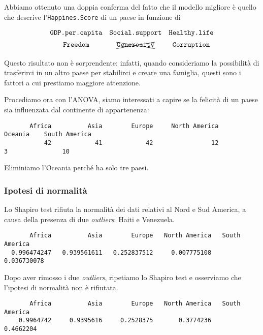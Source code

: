 \documentclass{beamer}
\newcommand{\fg}[2]{%
  \begin{center}
      \texttt{[image: \#2]}%
  \end{center}
}
\begin{document}
\begin{frame}
    Abbiamo ottenuto una doppia conferma del fatto che il modello migliore è quello che descrive l'\texttt{Happines.Score} di un paese in funzione di 
    \begin{equation*}
    {\renewcommand*{\arraystretch}{1.4}
    \begin{array}{ccc}
    {\texttt{GDP.per.capita}} & {\texttt{Social.support}} & {\texttt{Healthy.life}} \\
    {\texttt{Freedom}}        & \xcancel{\texttt{Generosity}}     & {\texttt{Corruption}}
    \end{array}}
    \end{equation*}

    Questo risultato non è sorprendente: infatti, quando consideriamo la possibilità di trasferirci in un altro paese per stabilirci e creare una famiglia, questi sono i fattori a cui prestiamo maggiore attenzione.
\end{frame}

\begin{frame}[fragile]
    Procediamo ora con l'ANOVA, siamo interessati a capire se la felicità di un paese sia influenzata dal continente di appartenenza:
    \tiny
    \begin{verbatim}
       Africa          Asia        Europe     North America       Oceania    South America 
           42            41            42                12             3               10
    \end{verbatim}
    \normalsize
    Eliminiamo l'Oceania perché ha solo tre paesi.
\end{frame}

\begin{frame}
\end{frame}

\begin{frame}[fragile]
    \frametitle{Ipotesi di normalità}
    Lo Shapiro test rifiuta la normalità dei dati relativi al Nord e Sud America, a causa della presenza di due \textit{outliers}: Haiti e Venezuela.

    \tiny
    \begin{verbatim}
       Africa          Asia        Europe   North America   South America 
  0.996474247   0.939561611   0.252837512     0.007775108     0.036730078 
    \end{verbatim}

\end{frame}

\begin{frame}[fragile]
    Dopo aver rimosso i due \textit{outliers}, ripetiamo lo Shapiro test e osserviamo che l'ipotesi di normalità non è rifiutata.

    \tiny
    \begin{verbatim}
       Africa          Asia        Europe   North America   South America 
    0.9964742     0.9395616     0.2528375       0.3774236       0.4662204 
    \end{verbatim}
\end{frame}
\end{document}
